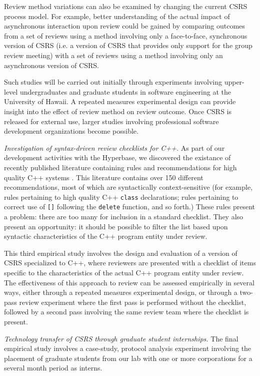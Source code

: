 \begin{itemizenoindent}
  Review method variations can also be examined by changing the current
  CSRS process model.  For example, better understanding of the actual
  impact of asynchronous interaction upon review could be gained by
  comparing outcomes from a set of reviews using a method involving only a
  face-to-face, synchronous version of CSRS (i.e. a version of CSRS that
  provides only support for the group review meeting) with a set of reviews
  using a method involving only an asynchronous version of CSRS.  
  
  Such studies will be carried out initially through experiments
  involving upper-level undergraduates and graduate students in software
  engineering at the University of Hawaii.  A repeated measures
  experimental design can provide insight into the effect of review method
  on review outcome.  Once CSRS is released for external use, larger
  studies involving professional software development organizations become
  possible.
  
\item {\em Investigation of syntax-driven review checklists for C++.} As
  part of our development activities with the Hyperbase, we discovered the
  existance of recently published literature containing rules and
  recommendations for high quality C++ systems
  \cite{Murray93,Ellemtel92,Meyers92,Cargill92,Coplien92}.  This literature
  contains over 150 different recommendations, most of which are
  syntactically context-sensitive (for example, rules pertaining to high
  quality C++ {\tt class} declarations; rules pertaining to correct use of
  {\tt []} following the {\tt delete} function, and so forth.)  These rules
  present a problem: there are too many for inclusion in a standard
  checklist. They also present an opportunity: it should be possible to
  filter the list based upon syntactic characteristics of the C++ program
  entity under review.
  
  This third empirical study involves the design and evaluation of a version
  of CSRS specialized to C++, where reviewers are presented with a
  checklist of items specific to the characteristics of the actual C++
  program entity under review.  The effectiveness of this approach to
  review can be assessed empirically in several ways, either through a
  repeated measures experimental design, or through a two-pass review
  experiment where the first pass is performed without the checklist,
  followed by a second pass involving the same review team where the
  checklist is present.

  
\item {\em Technology transfer of CSRS through graduate student
  internships.} The final empirical study involves a case-study, protocol
  analysis experiment involving the placement of graduate students from our
  lab with one or more corporations for a several month period as interns.


\end{itemizenoindent}
